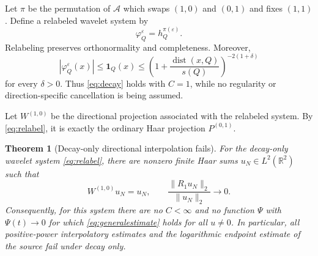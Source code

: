 \documentclass[11pt]{article}
\newtheorem{theorem}{Theorem}
\newcommand{\R}{\mathbb R}
\newcommand{\A}{\mathcal A}
\newcommand{\1}{\mathbf 1}
\begin{document}
Let $\pi$ be the permutation of $\A$ which swaps $(1,0)$ and $(0,1)$ and
fixes $(1,1)$. Define a relabeled wavelet system by
\begin{equation}
 \varphi_Q^\varepsilon=h_Q^{\pi(\varepsilon)}.
 \label{eq:relabel}
\end{equation}
Relabeling preserves orthonormality and completeness. Moreover,
\[
 |\varphi_Q^\varepsilon(x)|\leq\1_Q(x)
 \leq\left(1+\frac{\operatorname{dist}(x,Q)}{s(Q)}\right)^{-2(1+\delta)}
\]
for every $\delta>0$. Thus \eqref{eq:decay} holds with $C=1$, while no
regularity or direction-specific cancellation is being assumed.

Let $W^{(1,0)}$ be the directional projection associated with the relabeled
system. By \eqref{eq:relabel}, it is exactly the ordinary Haar projection
$P^{(0,1)}$.

\begin{theorem}[Decay-only directional interpolation fails]
For the decay-only wavelet system \eqref{eq:relabel}, there are nonzero finite
Haar sums $u_N\in L^2(\R^2)$ such that
\begin{equation}
 W^{(1,0)}u_N=u_N,
 \qquad
 \frac{\|R_1u_N\|_2}{\|u_N\|_2}\longrightarrow0.
 \label{eq:sequence}
\end{equation}
Consequently, for this system there are no $C<\infty$ and no function
$\Psi$ with $\Psi(t)\to0$ for which \eqref{eq:generalestimate} holds for all
$u\ne0$. In particular, all positive-power interpolatory estimates and the
logarithmic endpoint estimate of the source fail under decay only.
\end{theorem}
\end{document}
